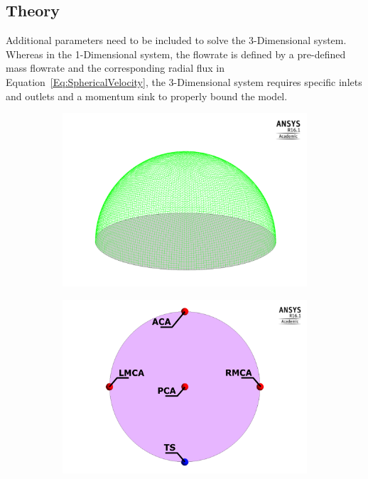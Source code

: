 \documentclass[11pt,english,a4paper,twoside,openright]{report}
\begin{document}
{{{{{{{{\subsection{Theory}

Additional parameters need to be included to solve the 3-Dimensional system. Whereas in the 1-Dimensional system, the flowrate is defined by a pre-defined mass flowrate and the corresponding radial flux in Equation~\ref{Eq:SphericalVelocity}, the 3-Dimensional system requires specific inlets and outlets and a momentum sink to properly bound the model. 

\begin{figure}[h]
	\centering
	\begin{subfigure}[b]{0.45\textwidth}
		\includegraphics[width=\textwidth]{3DHemisphere/HemisphereMesh}
	\end{subfigure}
	\begin{subfigure}[b]{0.45\textwidth}
		\includegraphics[width=\textwidth]{3DHemisphere/InletOutletLabels}

\end{subfigure}
\end{figure}}}}}}}}}
\end{document}
